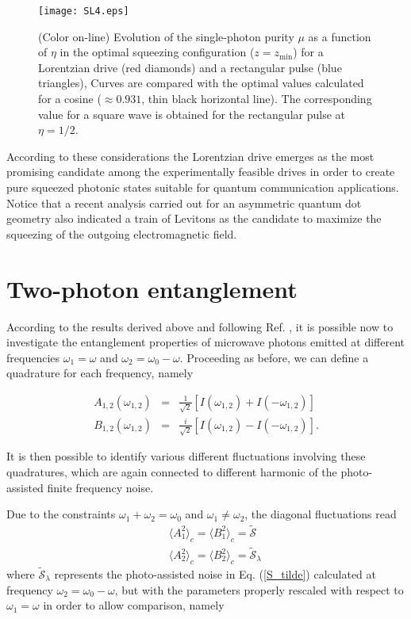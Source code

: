 \documentclass[twocolumn,showpacs,preprintnumbers,amsmath,amssymb%
 aps,
 prb,
 lengthcheck,%
]{revtex4-1}
\def\beq{\begin{eqnarray}}
\def\eeq{\end{eqnarray}}
\begin{document}
\begin{figure}[h]
\centering
\texttt{[image: SL4.eps]}
\caption{(Color on-line) Evolution of the single-photon purity $\mu$ as a function of $\eta$ in the optimal squeezing configuration ($z=z_{\mathrm{min}}$) for a Lorentzian drive (red diamonds) and a rectangular pulse (blue triangles), Curves are compared with the optimal values calculated for a cosine ($\approx 0.931$, thin black horizontal line). The corresponding value for a square wave is obtained for the rectangular pulse at $\eta=1/2$.} 
\label{fig4}
\end{figure}
According to these considerations the Lorentzian drive emerges as the most promising candidate among the experimentally feasible drives in order to create pure squeezed photonic states suitable for quantum communication applications. Notice that a recent analysis carried out for an asymmetric quantum dot geometry also indicated a train of Levitons as the candidate to maximize the squeezing of the outgoing electromagnetic field. \cite{mendes_cavity_2015}

\section{Two-photon entanglement}\label{Two_photons}
According to the results derived above and following Ref. , it is possible now to investigate the entanglement properties of microwave photons emitted at different frequencies $\omega_{1}=\omega$ and $\omega_{2}= \omega_{0}-\omega$. Proceeding as before, we can define a quadrature for each frequency, namely 

\beq
A_{1, 2}(\omega_{1,2})&=&\frac{1}{\sqrt{2}}\left[I(\omega_{1,2}) +I(-\omega_{1,2})\right]\\
B_{1, 2}(\omega_{1,2})&=&\frac{i}{\sqrt{2}}\left[I(\omega_{1,2}) -I(-\omega_{1,2})\right].
\eeq

It is then possible to identify various different fluctuations involving these quadratures, which are again connected to different harmonic of the photo-assisted finite frequency noise. 

Due to the constraints $\omega_{1}+\omega_{2}=\omega_{0}$  and $\omega_{1}\neq \omega_{2}$, the diagonal fluctuations read
\beq
&&\langle A^2_{1}  \rangle_{c}=\langle B^2_{1}  \rangle_{c}=\tilde{\mathcal{S}}\\
&&\langle A^2_{2}  \rangle_{c}=\langle B^2_{2}  \rangle_{c}=\tilde{\mathcal{S}}_{\lambda}
\eeq
where $\tilde{\mathcal{S}}_{\lambda}$ represents the photo-assisted noise in Eq. (\ref{S_tilde}) calculated at frequency $\omega_{2}= \omega_{0}-\omega$, but with the parameters properly rescaled with respect to $\omega_{1}=\omega$ in order to allow comparison, namely 
\end{document}
